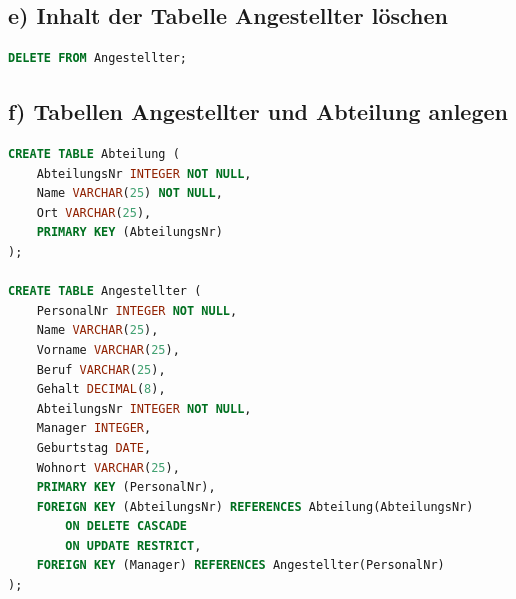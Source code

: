 \documentclass[12pt]{scrartcl}
\begin{document}
    \subsection*{e) Inhalt der Tabelle Angestellter löschen}
    \begin{lstlisting}[language=SQL]
DELETE FROM Angestellter;
    \end{lstlisting}

    \newpage

    \subsection*{f) Tabellen Angestellter und Abteilung anlegen}
\begin{lstlisting}[language=SQL]
CREATE TABLE Abteilung (
    AbteilungsNr INTEGER NOT NULL,
    Name VARCHAR(25) NOT NULL,
    Ort VARCHAR(25),
    PRIMARY KEY (AbteilungsNr)
);

CREATE TABLE Angestellter (
    PersonalNr INTEGER NOT NULL,
    Name VARCHAR(25),
    Vorname VARCHAR(25),
    Beruf VARCHAR(25),
    Gehalt DECIMAL(8),
    AbteilungsNr INTEGER NOT NULL,
    Manager INTEGER,
    Geburtstag DATE,
    Wohnort VARCHAR(25),
    PRIMARY KEY (PersonalNr),
    FOREIGN KEY (AbteilungsNr) REFERENCES Abteilung(AbteilungsNr)
        ON DELETE CASCADE
        ON UPDATE RESTRICT,
    FOREIGN KEY (Manager) REFERENCES Angestellter(PersonalNr)
);
\end{lstlisting}
\end{document}
